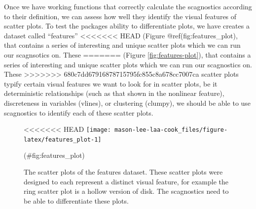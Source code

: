 Once we have working functions that correctly calculate the scagnostics
according to their definition, we can assess how well they identify the
visual features of scatter plots. To test the packages ability to
differentiate plots, we have creates a dataset called ``features''
<<<<<<< HEAD
(Figure @ref(fig:features\_plot), that contains a series of interesting
and unique scatter plots which we can run our scagnsotics on. These
=======
(Figure \ref{fig:features-plot}), that contains a series of interesting
and unique scatter plots which we can run our scagnostics on. These
>>>>>>> 680c7dd67916878715795fc855c8a678cc7007ca
scatter plots typify certain visual features we want to look for in
scatter plots, be it deterministic relationships (such as that shown in
the nonlinear feature), discreteness in variables (vlines), or
clustering (clumpy), we should be able to use scagnostics to identify
each of these scatter plots.

\begin{Schunk}
\begin{figure}
<<<<<<< HEAD
\texttt{[image: mason-lee-laa-cook\_files/figure-latex/features\_plot-1]} \caption[The scatter plots of the features dataset]{The scatter plots of the features dataset. These scatter plots were designed to each represent a distinct visual feature, for example the ring scatter plot is a hollow version of disk. The scagnostics need to be able to differentiate these plots. }(\#fig:features_plot)
\end{figure}
\end{Schunk}

